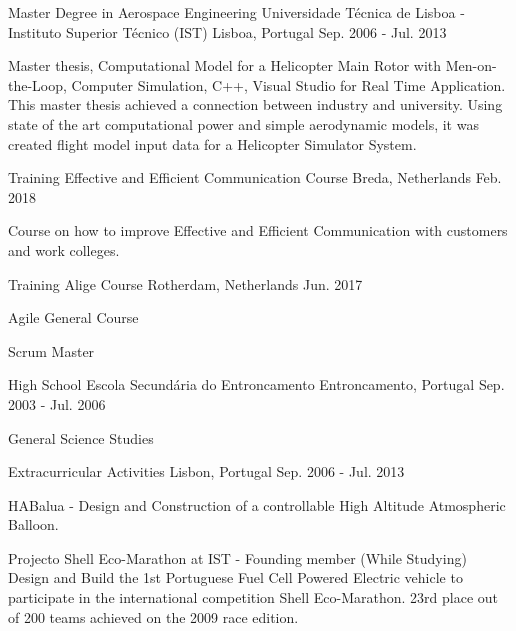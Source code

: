 \begin{cventries}
  \cventry
    {Master Degree in Aerospace Engineering}
    {Universidade Técnica de Lisboa - Instituto Superior Técnico (IST)}
    {Lisboa, Portugal}
    {Sep. 2006 - Jul. 2013}
    {
      \begin{cvitems}
        \item {Master thesis, Computational Model for a Helicopter Main Rotor with Men-on-the-Loop, Computer Simulation, C++, Visual Studio for Real Time Application. 
This master thesis achieved a connection between industry and university. Using state of the art computational power and simple aerodynamic models, it was created flight model input data for a Helicopter Simulator System.
}
      \end{cvitems}
    }
        \cventry
    {Training}
    {Effective and Efficient Communication Course}
    {Breda, Netherlands}
    {Feb. 2018}
    {  \begin{cvitems}
        \item Course on how to improve Effective and Efficient Communication with customers and work colleges.
        \end{cvitems}
  }
    \cventry
    {Training}
    {Alige Course}
    {Rotherdam, Netherlands}
    {Jun. 2017}
    {  \begin{cvitems}
        \item Agile General Course
        \item Scrum Master
        \end{cvitems}
  }
      \cventry
    {High School}
    {Escola Secundária do Entroncamento}
    {Entroncamento, Portugal}
    {Sep. 2003 - Jul. 2006}
    {
      \begin{cvitems}
        \item {General Science Studies}
      \end{cvitems}
    }
      \cventry
    {}
    {Extracurricular Activities}
    {Lisbon, Portugal}
    {Sep. 2006 - Jul. 2013}
    {
      \begin{cvitems}
    \item {HABalua - Design and Construction of a controllable High Altitude Atmospheric Balloon.}
    \item {Projecto Shell Eco-Marathon at IST - Founding member (While Studying) Design and Build the 1st Portuguese Fuel Cell Powered Electric vehicle to participate in the international competition Shell Eco-Marathon. 23rd place out of 200 teams achieved on the 2009 race edition.} 
      \end{cvitems}
    }
\end{cventries}

